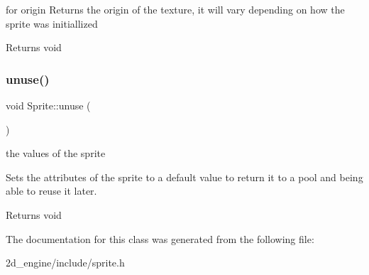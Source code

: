 for origin Returns the origin of the texture, it will vary depending on how the sprite was initiallized

\begin{DoxyReturn}{Returns}
void 
\end{DoxyReturn}
\mbox{\label{class_sprite_a26019c4dc52face7a098ddace9926863}} 
\subsubsection{\texorpdfstring{unuse()}{unuse()}}
{\footnotesize\ttfamily void Sprite\+::unuse (\begin{DoxyParamCaption}{ }\end{DoxyParamCaption})}

the values of the sprite

Sets the attributes of the sprite to a default value to return it to a pool and being able to reuse it later.

\begin{DoxyReturn}{Returns}
void 
\end{DoxyReturn}


The documentation for this class was generated from the following file\+:\begin{DoxyCompactItemize}
\item 
2d\+\_\+engine/include/sprite.\+h\end{DoxyCompactItemize}
